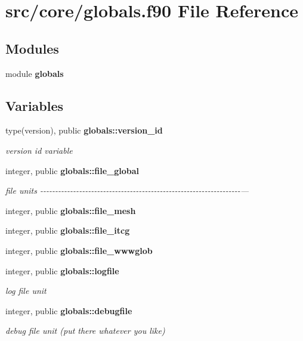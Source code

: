 \section{src/core/globals.f90 File Reference}
\label{globals_8f90}
\subsection*{Modules}
\begin{DoxyCompactItemize}
\item 
module {\bf globals}
\end{DoxyCompactItemize}
\subsection*{Variables}
\begin{DoxyCompactItemize}
\item 
type(version), public {\bf globals\+::version\+\_\+id}
\begin{DoxyCompactList}\small\item\em version id variable \end{DoxyCompactList}\item 
integer, public {\bf globals\+::file\+\_\+global}
\begin{DoxyCompactList}\small\item\em file units -\/-\/-\/-\/-\/-\/-\/-\/-\/-\/-\/-\/-\/-\/-\/-\/-\/-\/-\/-\/-\/-\/-\/-\/-\/-\/-\/-\/-\/-\/-\/-\/-\/-\/-\/-\/-\/-\/-\/-\/-\/-\/-\/-\/-\/-\/-\/-\/-\/-\/-\/-\/-\/-\/-\/-\/-\/-\/-\/-\/-\/-\/-\/-\/-\/-\/-\/--- \end{DoxyCompactList}\item 
integer, public {\bf globals\+::file\+\_\+mesh}
\item 
integer, public {\bf globals\+::file\+\_\+itcg}
\item 
integer, public {\bf globals\+::file\+\_\+wwwglob}
\item 
integer, public {\bf globals\+::logfile}
\begin{DoxyCompactList}\small\item\em log file unit \end{DoxyCompactList}\item 
integer, public {\bf globals\+::debugfile}
\begin{DoxyCompactList}\small\item\em debug file unit (put there whatever you like) \end{DoxyCompactList}\item 

\end{DoxyCompactItemize}
